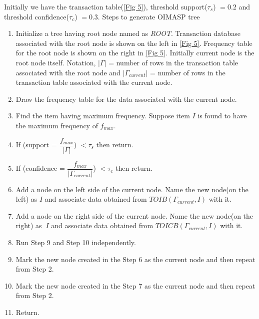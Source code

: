 \documentclass[review]{elsarticle}
\begin{document}
Initially we have the transaction table(\ref{Fig 5}), threshold support($ \tau _{s} $) $ = 0.2 $ and threshold confidence($ \tau _{c} $) $ = 0.3 $. Steps to generate OIMASP tree
\begin{enumerate}[Step 1.]
\item Initialize a tree having root node named as \emph{ROOT}. Transaction database associated with 
the root node is shown on the left in \ref{Fig 5}. Frequency table for the root node is shown on the right in \ref{Fig 5}.  Initially current node is the root node itself. Notation, $ \vert \Gamma \vert $ = number of rows in the transaction table associated with the root node and $ \vert \Gamma_{current} \vert $ = number of rows in the transaction table associated with the current node.
\item Draw the frequency table for the data associated with the current node.
\item Find the item having maximum frequency. Suppose item $ I $ is found to have the maximum frequency of $ f_{max} $.
\item If (support = $ \dfrac{f_{max}}{\vert \Gamma \vert} $) $ < \tau _{s} $ then return.
\item If (confidence = $ \dfrac{f_{max}}{\vert \Gamma_{current} \vert} $) $ < \tau _{c} $ then return.
\item Add a node on the left side of the current node. Name the new node(on the left) as $ I $ and associate data obtained from $ TOIB(\Gamma_{current}, I) $ with it.
\item Add a node on the right side of the current node. Name the new node(on the right) as $ ~I $ and associate data obtained from $ TOICB(\Gamma_{current}, I) $ with it.
\item Run Step 9 and Step 10 independently.
\item Mark the new node created in the Step 6 as the current node and then repeat from Step 2.
\item Mark the new node created in the Step 7 as the current node and then repeat from Step 2.
\item Return.
\end{enumerate}
\end{document}
